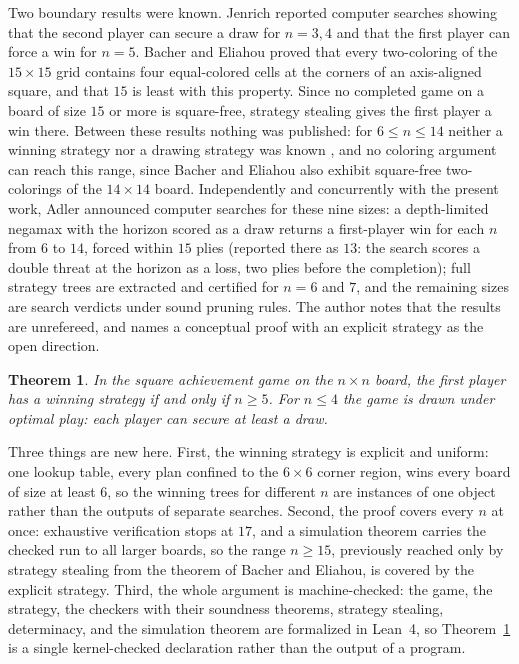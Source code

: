 \documentclass[11pt]{amsart}
\newtheorem{theorem}{Theorem}[section]
\theoremstyle{definition}
\theoremstyle{remark}
\begin{document}
Two boundary results were known. Jenrich \cite{jenrich} reported
computer searches showing that the second player can secure a draw for
$n = 3, 4$ and that the first player can force a win for $n = 5$.
Bacher and Eliahou \cite{bacher-eliahou} proved that every
two-coloring of the $15 \times 15$ grid contains four equal-colored
cells at the corners of an axis-aligned square, and that $15$ is least
with this property. Since no completed game on a board of size $15$ or
more is square-free, strategy stealing gives the first player a win
there. Between these results nothing was published: for
$6 \le n \le 14$ neither a winning strategy nor a drawing strategy was
known \cite{opg}, and no coloring argument can reach this range, since
Bacher and Eliahou also exhibit square-free two-colorings of the
$14 \times 14$ board. Independently and concurrently with the present
work, Adler \cite{adler} announced computer searches for these nine
sizes: a depth-limited negamax with the horizon scored as a draw
returns a first-player win for each $n$ from $6$ to $14$, forced
within $15$ plies (reported there as $13$: the search scores a double
threat at the horizon as a loss, two plies before the completion); full strategy trees are extracted and certified for $n = 6$ and
$7$, and the remaining sizes are search verdicts under sound pruning
rules. The author notes that the results are unrefereed, and names a
conceptual proof with an explicit strategy as the open direction.

\begin{theorem}\label{thm:main}
In the square achievement game on the $n \times n$ board, the first
player has a winning strategy if and only if $n \ge 5$. For
$n \le 4$ the game is drawn under optimal play: each player can
secure at least a draw.
\end{theorem}

Three things are new here. First, the winning strategy is explicit
and uniform: one lookup table, every plan confined to the
$6 \times 6$ corner region, wins every board of size at least $6$, so
the winning trees for different $n$ are instances of one object
rather than the outputs of separate searches. Second, the proof
covers every $n$ at once: exhaustive verification stops at $17$, and
a simulation theorem carries the checked run to all larger boards, so
the range $n \ge 15$, previously reached only by strategy stealing
from the theorem of Bacher and Eliahou, is covered by the explicit
strategy. Third, the whole argument is machine-checked: the game, the
strategy, the checkers with their soundness theorems, strategy
stealing, determinacy, and the simulation theorem are formalized in
Lean~4, so Theorem~\ref{thm:main} is a single kernel-checked
declaration rather than the output of a program.
\end{document}
